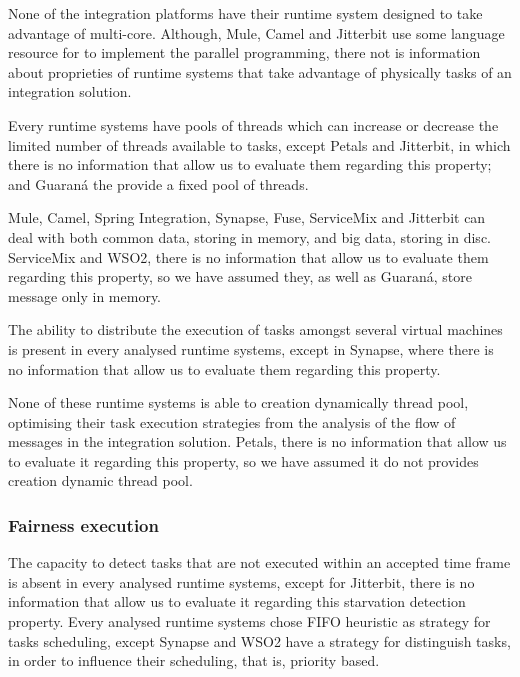 \noindent

None of the integration platforms have their runtime system designed to take advantage of multi-core. Although, Mule, Camel and Jitterbit use some language resource for to implement the parallel programming, there not is information about proprieties of runtime systems that take advantage of physically tasks of an integration solution.

Every runtime systems have pools of threads which can increase or decrease the limited number of threads available to tasks, except Petals and Jitterbit, in which there is no information that allow us to evaluate them regarding this property; and Guaraná the provide a fixed pool of threads.

Mule, Camel, Spring Integration, Synapse, Fuse, ServiceMix and Jitterbit can deal with both common data, storing in memory, and big data, storing in disc. ServiceMix and WSO2, there is no information that allow us to evaluate them regarding this property, so we have assumed they, as well as Guaraná, store message only in memory.

The ability to distribute the execution of tasks amongst several virtual machines is present in every analysed runtime systems, except in Synapse, where there is no information that allow us to evaluate them regarding this property. 

None of these runtime systems is able to creation dynamically thread pool, optimising their task execution strategies from the analysis of the flow of messages in the integration solution. Petals, there is no information that allow us to evaluate it regarding this property, so we have assumed it do not provides creation dynamic thread pool.

\subsubsection{Fairness execution}
\label{subsubsec:comparasion_fairness}
 
 \noindent

The capacity to detect tasks that are not executed within an accepted time frame is absent in every analysed runtime systems, except for Jitterbit, there is no information that allow us to evaluate it regarding this starvation detection property. Every analysed runtime systems chose FIFO heuristic as strategy for tasks scheduling, except Synapse and WSO2 have a strategy for distinguish tasks, in order to influence their scheduling, that is, priority based. 

